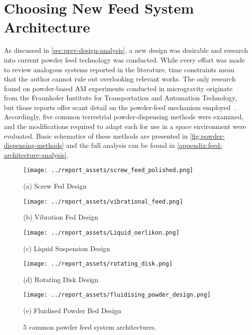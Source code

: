 \section{Choosing New Feed System Architecture}\label{sec:system_architecture}
As discussed in \autoref{sec:prev-design-analysis}, a new design was desirable and research into current powder feed technology was conducted. While every effort was made to review analogous systems reported in the literature, time constraints mean that the author cannot rule out overlooking relevant works. The only research found on powder-based AM experiments conducted in microgravity originate from the Fraunhofer Institute for Transportation and Automation Technology, but those reports offer scant detail on the powder-feed mechanism employed~\cite{OVERMEYER2025}. Accordingly, five common terrestrial powder-dispensing methods were examined, and the modifications required to adapt each for use in a space environment were evaluated. Basic schematics of these methods are presented in \autoref{fig:powder-dispensing-methods} and the full analysis can be found in \autoref{appendix:feed-architecture-analysis}. 
\begin{figure}[htbp]
    \centering

    \begin{minipage}{0.3\textwidth}
        \centering
        \texttt{[image: ../report\_assets/screw\_feed\_polished.png]}
        \caption*{(a) Screw Fed Design~\cite{Bitragunta2015}}
    \end{minipage}
    \hfill
    \begin{minipage}{0.3\textwidth}
        \centering
        \texttt{[image: ../report\_assets/vibrational\_feed.png]}
        \caption*{(b) Vibration Fed Design~\cite{Sinclair2021}}
    \end{minipage}
    \hfill
    \begin{minipage}{0.3\textwidth}
        \centering
        \texttt{[image: ../report\_assets/Liquid\_oerlikon.png]}
        \caption*{(c) Liquid Suspension Design~\cite{OerlikonMetcoFeeders2023}}
    \end{minipage}

    \vspace{0.5cm} %

    \begin{minipage}{0.35\textwidth}
        \centering
        \texttt{[image: ../report\_assets/rotating\_disk.png]}
        \caption*{(d) Rotating Disk Design~\cite{Crawmer2013}}
    \end{minipage}
    \hspace{0.1\textwidth}
    \begin{minipage}{0.35\textwidth}
        \centering
        \texttt{[image: ../report\_assets/fluidising\_powder\_design.png]}
        \caption*{(e) Fluidised Powder Bed Design~\cite{Li2016}}
    \end{minipage}

    \caption{5 common powder feed system architectures.}\label{fig:powder-dispensing-methods}
\end{figure}
